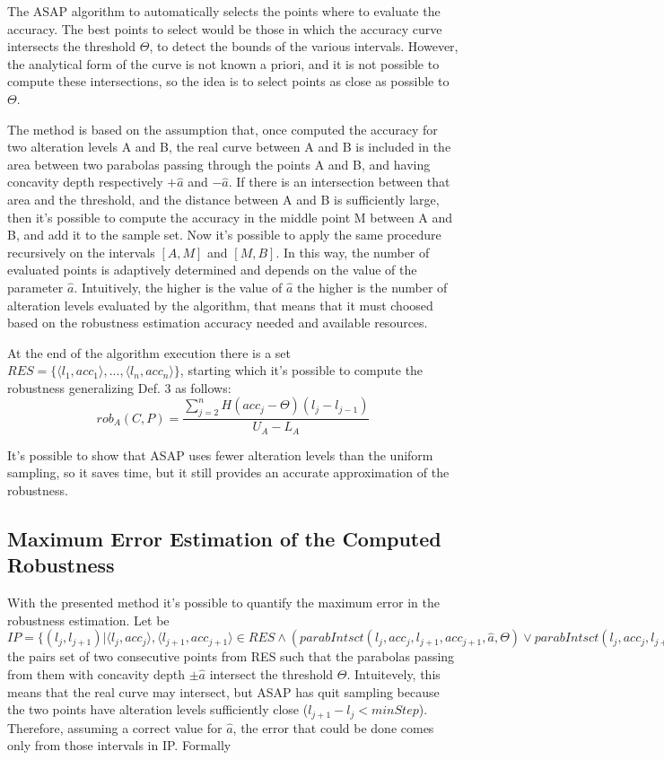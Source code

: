 The ASAP algorithm to automatically selects the points where to evaluate the accuracy. The best points to select would be those in which the accuracy curve intersects the threshold $\Theta$, to detect the bounds of the various intervals. However, the analytical form of the curve is not known a priori, and it is not possible to compute these intersections, so the idea is to select points as close as possible to $\Theta$.

The method is based on the assumption that, once computed the accuracy for two alteration levels A and B, the real curve between A and B is included in the area between two parabolas passing through the points A and B, and having concavity depth respectively $+\hat{a}$ and $-\hat{a}$. If there is an intersection between that area and the threshold, and the distance between A and B is sufficiently large, then it's possible to compute the accuracy in the middle point M between A and B, and add it to the sample set. Now it's possible to apply the same procedure recursively on the intervals $[A, M]$ and $[M, B]$. In this way, the number of evaluated points is adaptively determined and depends on the value of the parameter $\hat{a}$. Intuitively, the higher is the value of $\hat{a}$ the higher is the number of alteration levels evaluated by the algorithm, that means that it must choosed based on the robustness estimation accuracy needed and available resources.

At the end of the algorithm execution there is a set $RES = \{ \langle l_1, acc_1 \rangle, ...,\langle l_n, acc_n \rangle\}$, starting which it's possible to compute the robustness generalizing Def. 3 as follows:
\[
	rob_A(C,P) = \frac{\sum_{j = 2}^{n} H(acc_j - \Theta)(l_j - l_{j-1})}{U_A - L_A}
\]

It's possible to show that ASAP uses fewer alteration levels than the uniform sampling, so it saves time, but it still provides an accurate approximation of the robustness.

\subsection{Maximum Error Estimation of the Computed Robustness}

With the presented method it's possible to quantify the maximum error in the robustness estimation. Let be $IP = \{(l_j,l_{j+1}) | \langle l_j, acc_j \rangle, \langle l_{j+1}, acc_{j+1} \rangle  \in RES \land (parabIntsct(l_j, acc_j,l_{j+1}, acc_{j+1}, \hat{a}, \Theta) \lor parabIntsct(l_j, acc_j,l_{j+1}, acc_{j+1}, -\hat{a}, \Theta))\}$ the pairs set of two consecutive points from RES such that the parabolas passing from them with concavity depth $\pm \hat{a}$ intersect the threshold $\Theta$. Intuitevely, this means that the real curve may intersect, but ASAP has quit sampling because the two points have alteration levels sufficiently close ($l_{j+1} - l_j < minStep$). Therefore, assuming a correct value for $\hat{a}$, the error that could be done comes only from those intervals in IP. Formally

